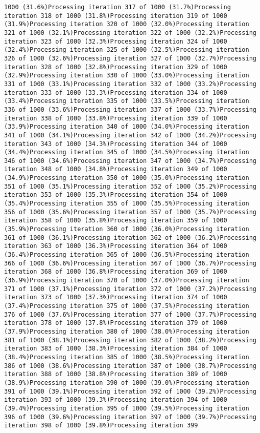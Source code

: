 \documentclass[
]{article}
\begin{document}
\begin{verbatim}
1000 (31.6%)Processing iteration 317 of 1000 (31.7%)Processing iteration 318 of 1000 (31.8%)Processing iteration 319 of 1000 (31.9%)Processing iteration 320 of 1000 (32.0%)Processing iteration 321 of 1000 (32.1%)Processing iteration 322 of 1000 (32.2%)Processing iteration 323 of 1000 (32.3%)Processing iteration 324 of 1000 (32.4%)Processing iteration 325 of 1000 (32.5%)Processing iteration 326 of 1000 (32.6%)Processing iteration 327 of 1000 (32.7%)Processing iteration 328 of 1000 (32.8%)Processing iteration 329 of 1000 (32.9%)Processing iteration 330 of 1000 (33.0%)Processing iteration 331 of 1000 (33.1%)Processing iteration 332 of 1000 (33.2%)Processing iteration 333 of 1000 (33.3%)Processing iteration 334 of 1000 (33.4%)Processing iteration 335 of 1000 (33.5%)Processing iteration 336 of 1000 (33.6%)Processing iteration 337 of 1000 (33.7%)Processing iteration 338 of 1000 (33.8%)Processing iteration 339 of 1000 (33.9%)Processing iteration 340 of 1000 (34.0%)Processing iteration 341 of 1000 (34.1%)Processing iteration 342 of 1000 (34.2%)Processing iteration 343 of 1000 (34.3%)Processing iteration 344 of 1000 (34.4%)Processing iteration 345 of 1000 (34.5%)Processing iteration 346 of 1000 (34.6%)Processing iteration 347 of 1000 (34.7%)Processing iteration 348 of 1000 (34.8%)Processing iteration 349 of 1000 (34.9%)Processing iteration 350 of 1000 (35.0%)Processing iteration 351 of 1000 (35.1%)Processing iteration 352 of 1000 (35.2%)Processing iteration 353 of 1000 (35.3%)Processing iteration 354 of 1000 (35.4%)Processing iteration 355 of 1000 (35.5%)Processing iteration 356 of 1000 (35.6%)Processing iteration 357 of 1000 (35.7%)Processing iteration 358 of 1000 (35.8%)Processing iteration 359 of 1000 (35.9%)Processing iteration 360 of 1000 (36.0%)Processing iteration 361 of 1000 (36.1%)Processing iteration 362 of 1000 (36.2%)Processing iteration 363 of 1000 (36.3%)Processing iteration 364 of 1000 (36.4%)Processing iteration 365 of 1000 (36.5%)Processing iteration 366 of 1000 (36.6%)Processing iteration 367 of 1000 (36.7%)Processing iteration 368 of 1000 (36.8%)Processing iteration 369 of 1000 (36.9%)Processing iteration 370 of 1000 (37.0%)Processing iteration 371 of 1000 (37.1%)Processing iteration 372 of 1000 (37.2%)Processing iteration 373 of 1000 (37.3%)Processing iteration 374 of 1000 (37.4%)Processing iteration 375 of 1000 (37.5%)Processing iteration 376 of 1000 (37.6%)Processing iteration 377 of 1000 (37.7%)Processing iteration 378 of 1000 (37.8%)Processing iteration 379 of 1000 (37.9%)Processing iteration 380 of 1000 (38.0%)Processing iteration 381 of 1000 (38.1%)Processing iteration 382 of 1000 (38.2%)Processing iteration 383 of 1000 (38.3%)Processing iteration 384 of 1000 (38.4%)Processing iteration 385 of 1000 (38.5%)Processing iteration 386 of 1000 (38.6%)Processing iteration 387 of 1000 (38.7%)Processing iteration 388 of 1000 (38.8%)Processing iteration 389 of 1000 (38.9%)Processing iteration 390 of 1000 (39.0%)Processing iteration 391 of 1000 (39.1%)Processing iteration 392 of 1000 (39.2%)Processing iteration 393 of 1000 (39.3%)Processing iteration 394 of 1000 (39.4%)Processing iteration 395 of 1000 (39.5%)Processing iteration 396 of 1000 (39.6%)Processing iteration 397 of 1000 (39.7%)Processing iteration 398 of 1000 (39.8%)Processing iteration 399 
\end{verbatim}
\end{document}
